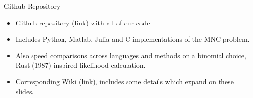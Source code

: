 \documentclass[aspectratio=1610,handout]{beamer}
\begin{document}
\begin{frame}{Github Repository}
    \begin{itemize}
        \item Github repository (\href{https://github.com/nateybear/parallel-racers}{link}) with all of our code.
        \item Includes Python, Matlab, Julia and C implementations of the MNC problem.
        \item Also speed comparisons across languages and methods on a binomial choice, Rust (1987)-inspired likelihood calculation.
        \item Corresponding Wiki (\href{https://github.com/nateybear/parallel-racers/wiki}{link}), includes some details which expand on these slides.
    \end{itemize}
\end{frame}
\end{document}
